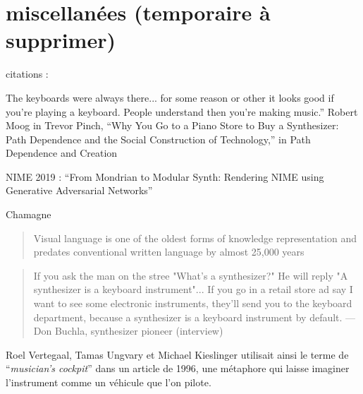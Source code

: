 \section*{miscellanées (temporaire à supprimer)}
citations :

The  keyboards  were  always  there...  for  some  reason  or  other  it  looks  good  if  you’re playing a keyboard. People understand then you’re making music.” Robert Moog in Trevor Pinch, “Why You Go to a Piano Store to Buy a Synthesizer: Path Dependence and the Social Construction of Technology,” in Path Dependence and Creation


NIME 2019 : ``From Mondrian to Modular Synth: Rendering NIME using Generative Adversarial Networks''

Chamagne

\begin{quote}
Visual language is one of the oldest forms of knowledge representation and predates conventional written language by almost 25,000 years
\end{quote}
\cite{tufte_visual_2001}

\cite{moody_physics_2009}


\begin{quotation}
If you ask the man on the stree "What's a synthesizer?" He will reply "A synthesizer is a keyboard instrument"... If you go in a retail store ad say I want to see some electronic instruments, they'll send you to the keyboard department, because a synthesizer is a keyboard instrument by default. — Don Buchla, synthesizer pioneer (interview)
\end{quotation}
\cite{pinch_why_2001}

Roel Vertegaal, Tamas Ungvary et Michael Kieslinger utilisait ainsi le terme de ``\textit{musician's cockpit}'' dans un article de 1996, une métaphore qui laisse imaginer l'instrument comme un véhicule que l'on pilote.